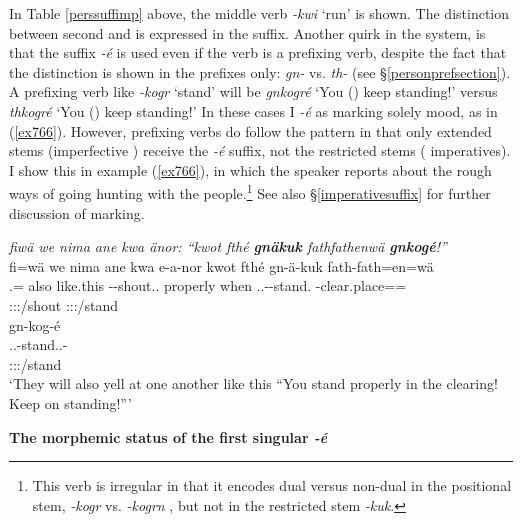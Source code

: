 In Table \ref{perssuffimp} above, the middle verb \emph{-kwi} `run' is shown. The distinction between second  and  is expressed in the suffix. Another quirk in the system, is that the suffix \emph{-é} is used even if the verb is a prefixing verb, despite the fact that the  distinction is shown in the prefixes only: \emph{gn-} \Ssg{} vs. \emph{th-} \Snsg{} (see \S\ref{personprefsection}). A prefixing verb like \emph{-kogr} `stand' will be \emph{gnkogré} `You (\Sg) keep standing!' versus \emph{thkogré} `You (\Pl) keep standing!' In these cases I  \emph{-é} as marking solely  mood, as in (\ref{ex766}). However, prefixing verbs do follow the pattern in that only extended stems (imperfective ) receive the \emph{-é} suffix, not the restricted stems ( imperatives). I show this in example (\ref{ex766}), in which the speaker reports about the rough ways of going hunting with the  people.\footnote{This verb is irregular in that it encodes dual versus non-dual in the positional stem, \emph{-kogr} \Ndu{} vs. \emph{-kogrn} \Du{}, but not in the restricted stem \emph{-kuk}.} See also \S\ref{imperativesuffix} for further discussion of  marking.

\begin{exe}
	\ex \emph{fiwä we nima ane kwa änor: ``kwot fthé \textbf{gnäkuk} fathfathenwä \textbf{gnkogé}!''}\\
	\glll fi=wä we nima ane kwa e-a-nor kwot fthé gn-ä-kuk fath-fath=en=wä\\
	\Third.\Abs{}=\Emph{} also like.this \Dem{} \Fut{} \Stnsg-\Vc-shout.\Ext.\Ndu{} properly when \Ssg.\Bet.\Imp-\Ndu-stand.\Rs{} \Redup-clear.place=\Loc=\Emph{}\\
	{} {} {} {} {} {\footnotesize \Tpl:\Sbj:\Nonpast:\Ipfv/shout} {} {} {\footnotesize \Ssg:\Sbj:\Imp:\Pfv/stand} {}\\
	\sn
	\glll gn-kog-é\\
	\Ssg.\Bet.\Imp-stand.\Ext.\Ndu-\Imp{}\\
	{\footnotesize \Ssg:\Sbj:\Imp:\Ipfv/stand}\\
	\trans `They will also yell at one another like this ``You stand properly in the clearing! Keep on standing!'''
	\label{ex766}
\end{exe}

\noindent
\textbf{The morphemic status of the first singular \emph{-é}}%

